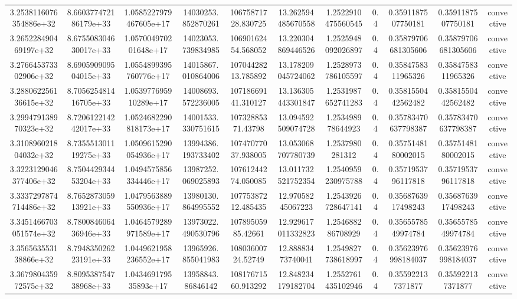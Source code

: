 \begin{table}
\begin{tabular}{ccccccccccc}
3.2538116076354886e+32 & 8.660377472186179e+33 & 1.0585227979467605e+17 & 14030253.852870261 & 10675871728.830725 & 13.262594485670558 & 1.2522910475560545 & 0.4 & 0.3591187507750181 & 0.3591187507750181 & convective \\
3.265228490469197e+32 & 8.675508304630017e+33 & 1.057004970201648e+17 & 14023053.739834985 & 10690162454.568052 & 13.220304869446526 & 1.2525948092026897 & 0.4 & 0.35879706681305606 & 0.35879706681305606 & convective \\
3.276645373302906e+32 & 8.690590909504015e+33 & 1.0554899395760776e+17 & 14015867.010864006 & 10704428213.785892 & 13.178209045724062 & 1.2528973786105597 & 0.4 & 0.3584758311965326 & 0.3584758311965326 & convective \\
3.288062256136615e+32 & 8.705625481416705e+33 & 1.053977695910289e+17 & 14008693.572236005 & 10718669141.310127 & 13.136305443301847 & 1.2531987652741283 & 0.4 & 0.3581550442562482 & 0.3581550442562482 & convective \\
3.299479138970323e+32 & 8.720612214242017e+33 & 1.0524682290818173e+17 & 14001533.330751615 & 10732885371.43798 & 13.094592509074728 & 1.253498978644923 & 0.4 & 0.35783470637798387 & 0.35783470637798387 & convective \\
3.310896021804032e+32 & 8.735551301119275e+33 & 1.0509615290054936e+17 & 13994386.193733402 & 10747077037.938005 & 13.053068707780739 & 1.2537980281312 & 0.4 & 0.3575148180002015 & 0.3575148180002015 & convective \\
3.3223129046377406e+32 & 8.750442934453204e+33 & 1.0494575856334446e+17 & 13987252.069025893 & 10761244274.050085 & 13.011732521752354 & 1.2540959230975788 & 0.4 & 0.3571953796117818 & 0.3571953796117818 & convective \\
3.3337297874714486e+32 & 8.765287305913921e+33 & 1.0479563889550936e+17 & 13980130.864995552 & 10775387212.485435 & 12.97058245067223 & 1.2543926728647141 & 0.4 & 0.3568763917498243 & 0.3568763917498243 & convective \\
3.3451466703051574e+32 & 8.780084606436946e+33 & 1.0464579289971589e+17 & 13973022.490530796 & 10789505985.42661 & 12.929617011332823 & 1.254688286708929 & 0.4 & 0.3565578549974784 & 0.3565578549974784 & convective \\
3.356563553138866e+32 & 8.794835026223191e+33 & 1.0449621958236552e+17 & 13965926.855041983 & 10803600724.52749 & 12.88883473740041 & 1.2549827738618997 & 0.4 & 0.35623976998184037 & 0.35623976998184037 & convective \\
3.367980435972575e+32 & 8.809538754738968e+33 & 1.043469179535893e+17 & 13958843.86846142 & 10817671560.913292 & 12.848234179182704 & 1.2552761435102946 & 0.4 & 0.355922137371877 & 0.355922137371877 & convective \\

\end{tabular}
\end{table}
